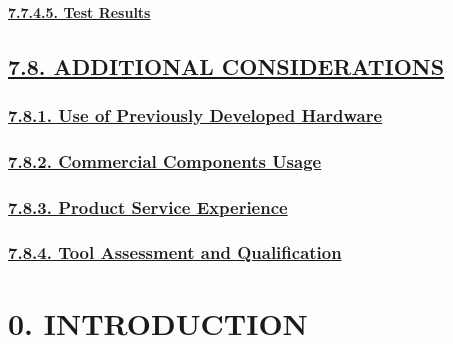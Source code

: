 \documentclass[
]{article}
\begin{document}
\hypertarget{test-results}{%
\paragraph{\texorpdfstring{\protect\hyperlink{test-results-1}{7.7.4.5.
Test Results}}{7.7.4.5. Test Results}}\label{test-results}}

\hypertarget{additional-considerations}{%
\subsection{\texorpdfstring{\protect\hyperlink{additional-considerations-1}{7.8.
ADDITIONAL
CONSIDERATIONS}}{7.8. ADDITIONAL CONSIDERATIONS}}\label{additional-considerations}}

\hypertarget{use-of-previously-developed-hardware}{%
\subsubsection{\texorpdfstring{\protect\hyperlink{use-of-previously-developed-hardware-1}{7.8.1.
Use of Previously Developed
Hardware}}{7.8.1. Use of Previously Developed Hardware}}\label{use-of-previously-developed-hardware}}

\hypertarget{commercial-components-usage}{%
\subsubsection{\texorpdfstring{\protect\hyperlink{commercial-components-usage-1}{7.8.2.
Commercial Components
Usage}}{7.8.2. Commercial Components Usage}}\label{commercial-components-usage}}

\hypertarget{product-service-experience}{%
\subsubsection{\texorpdfstring{\protect\hyperlink{product-service-experience-1}{7.8.3.
Product Service
Experience}}{7.8.3. Product Service Experience}}\label{product-service-experience}}

\hypertarget{tool-assessment-and-qualification}{%
\subsubsection{\texorpdfstring{\protect\hyperlink{tool-assessment-and-qualification-1}{7.8.4.
Tool Assessment and
Qualification}}{7.8.4. Tool Assessment and Qualification}}\label{tool-assessment-and-qualification}}

\hypertarget{introduction-1}{%
\section{0. INTRODUCTION}\label{introduction-1}}
\end{document}
